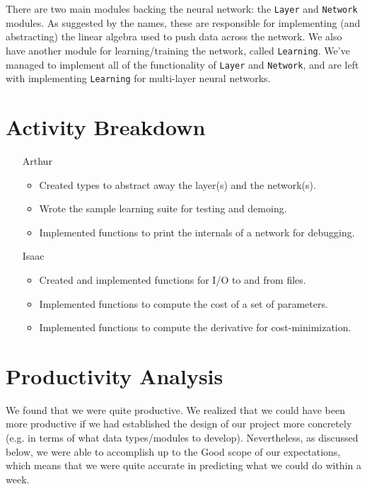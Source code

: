 \documentclass{article}
\begin{document}
There are two main modules backing the neural network: the \texttt{Layer} and \texttt{Network} modules. As suggested by the names, these are responsible for implementing (and abstracting) the linear algebra used to push data across the network. We also have another module for learning/training the network, called \texttt{Learning}. We've managed to implement all of the functionality of \texttt{Layer} and \texttt{Network}, and are left with implementing \texttt{Learning} for multi-layer neural networks.

\section{Activity Breakdown}
\label{sec:activity}

\begin{itemize}[leftmargin=2cm]

\item[Arthur]
	\begin{itemize}
	
	\item Created types to abstract away the layer(s) and the network(s).
	\item Wrote the sample learning suite for testing and demoing.
	\item Implemented functions to print the internals of a network for debugging.

	\end{itemize}

\item[Isaac]
	\begin{itemize}
	
	\item Created and implemented functions for I/O to and from files.
	\item Implemented functions to compute the cost of a set of parameters.
	\item Implemented functions to compute the derivative for cost-minimization.
	
	\end{itemize}

\end{itemize}

\section{Productivity Analysis}
\label{sec:productivity}

We found that we were quite productive. We realized that we could have been more productive if we had established the design of our project more concretely (e.g. in terms of what data types/modules to develop). Nevertheless, as discussed below, we were able to accomplish up to the Good scope of our expectations, which means that we were quite accurate in predicting what we could do within a week.
\end{document}
